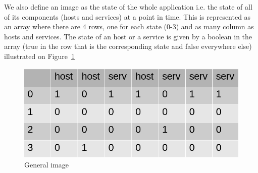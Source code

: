 \documentclass[10pt,a4paper,oneside]{article}
\begin{document}
\vspace{0.8cm}

\begin{multicols}{2}
We also define an image as the state of the whole application i.e. the state of all of its components (hosts and services) at a point in time. This is represented as an array where there are 4 rows, one for each state (0-3) and as many column as hosts and services. The state of an host or a service is given by a boolean in the array (true in the row that is the corresponding state and false everywhere else) illustrated on Figure~\ref{tab}

\end{multicols}

\vspace{0.8cm}

\begin{figure}[!h]
\centering
\includegraphics[scale=0.5]{./images/image.png}
\caption{General image}
\label{tab}
\end{figure}

\vspace{0.8cm}
\end{document}
